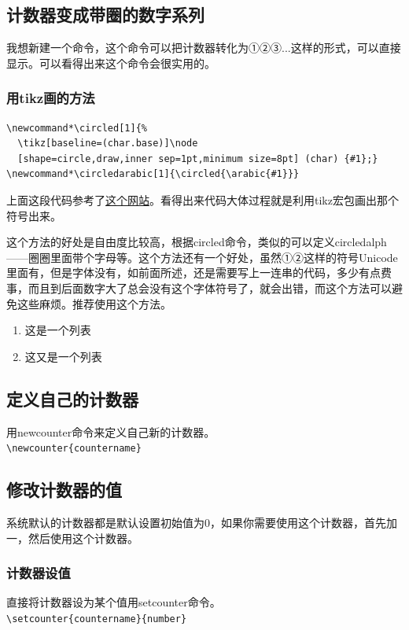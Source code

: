 \documentclass[12pt,oneside]{book}
\begin{document}
\begin{common-format}
\subsection{计数器变成带圈的数字系列}
我想新建一个命令，这个命令可以把计数器转化为①②③...这样的形式，可以直接显示。可以看得出来这个命令会很实用的。

\subsubsection{用tikz画的方法}
\begin{Verbatim}
\newcommand*\circled[1]{%
  \tikz[baseline=(char.base)]\node
  [shape=circle,draw,inner sep=1pt,minimum size=8pt] (char) {#1};}
\newcommand*\circledarabic[1]{\circled{\arabic{#1}}}
\end{Verbatim}

上面这段代码参考了\href{http://tex.stackexchange.com/questions/133264/circled-footnote-symbols-with-pifont-showing-arrows-instead-of-circled-numbers}{这个网站}。看得出来代码大体过程就是利用tikz宏包画出那个符号出来。

这个方法的好处是自由度比较高，根据circled命令，类似的可以定义circledalph——圈圈里面带个字母等。这个方法还有一个好处，虽然①②这样的符号Unicode里面有，但是字体没有，如前面所述，还是需要写上一连串的代码，多少有点费事，而且到后面数字大了总会没有这个字体符号了，就会出错，而这个方法可以避免这些麻烦。推荐使用这个方法。

\begin{enumerate}
\renewcommand{\labelenumi}{\circledarabic{enumi}}
\item 这是一个列表
\item 这又是一个列表
\end{enumerate}

\subsection{定义自己的计数器}
用newcounter命令来定义自己新的计数器。\\
\verb+\newcounter{countername}+

\subsection{修改计数器的值}
系统默认的计数器都是默认设置初始值为0，如果你需要使用这个计数器，首先加一，然后使用这个计数器。
\subsubsection{计数器设值}
直接将计数器设为某个值用setcounter命令。\\
\verb+\setcounter{countername}{number}+

\end{common-format}
\end{document}
